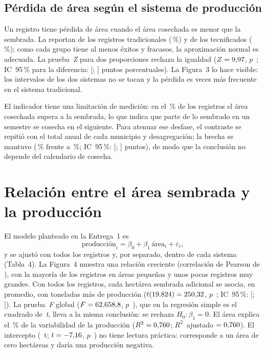 \documentclass[12pt,letterpaper]{article}
\begin{document}
\subsection{Pérdida de área según el sistema de producción}

Un registro tiene pérdida de área cuando el área cosechada es menor que la
sembrada. La reportan \XTrad{} de los \NTrad{} registros tradicionales
(\PropTrad\,\%) y \XTec{} de los \NTec{} tecnificados (\PropTec\,\%); como cada
grupo tiene al menos \CondNp{} éxitos y fracasos, la aproximación normal es
adecuada. La prueba~\textit{Z} para dos proporciones rechaza la igualdad
($Z = 9{,}97$, $p$~\ZpRel; IC~95\,\% para la diferencia: [\DifPropInf;
\DifPropSup] puntos porcentuales). La Figura~3 lo hace visible: los intervalos
de los dos sistemas no se tocan y la pérdida es \RazonProp{} veces más
frecuente en el sistema tradicional.

El indicador tiene una limitación de medición: en el \PctCosMayor\,\% de los
registros el área cosechada supera a la sembrada, lo que indica que parte de
lo sembrado en un semestre se cosecha en el siguiente. Para atenuar ese desfase, el
contraste se repitió con el total anual de cada municipio y desagregación; la
brecha se mantuvo (\PropAnualTrad\,\% frente a \PropAnualTec\,\%; IC~95\,\%:
[\DifPropAnualInf; \DifPropAnualSup] puntos), de modo que la conclusión no
depende del calendario de cosecha.

\section{Relación entre el área sembrada y la producción}

El modelo planteado en la Entrega~1 es
\[
\text{producción}_i = \beta_0 + \beta_1\,\text{área}_i + \varepsilon_i ,
\]
y se ajustó con todos los registros y, por separado, dentro de cada sistema
(Tabla~4). La Figura~4 muestra una relación creciente (correlación de Pearson
de \CorrArea), con la mayoría de los registros en áreas pequeñas y unos pocos
registros muy grandes. Con todos los registros, cada hectárea sembrada
adicional se asocia, en promedio, con \RGPenEst{} toneladas más de producción
($t(19.824) = 250{,}32$, $p$~\RGPenPRel; IC~95\,\%: [\RGPenLi; \RGPenLs]).
La prueba~\textit{F} global ($F = 62.658{,}8$, $p$~\RGpFRel), que en la regresión
simple es el cuadrado de~\textit{t}, lleva a la misma conclusión: se rechaza
$H_0\colon \beta_1 = 0$. El área explica el \RGRdosPct\,\% de la variabilidad
de la producción ($R^2 = 0{,}760$; $R^2$~ajustado $= 0{,}760$). El
intercepto (\RGIntEst~t; $t = -7{,}16$, $p$~\RGIntPRel) no tiene lectura
práctica: corresponde a un área de cero hectáreas y daría una producción
negativa.
\end{document}
